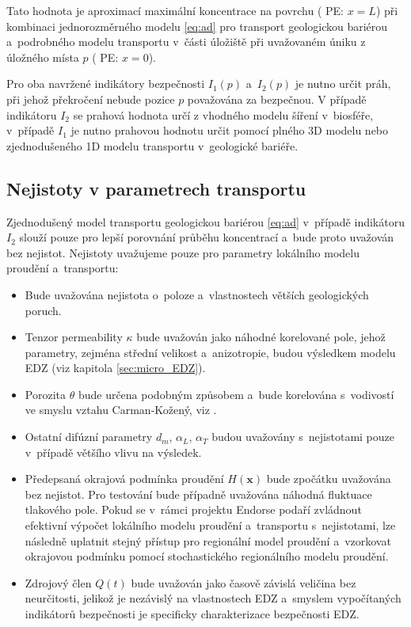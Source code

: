 \documentclass{article}
\def\vc#1{\mathbf{\boldsymbol{#1}}}     %
\newcommand{\pe}[1]{{\color{orange} PE: #1}}
\begin{document}
Tato hodnota je aproximací maximální koncentrace na povrchu (\pe{$x=L$})
při kombinaci jednorozměrného modelu \eqref{eq:ad} pro transport geologickou bariérou a~podrobného modelu transportu v~části úložiště při uvažovaném úniku z úložného místa $p$ (\pe{$x=0$}). 

Pro oba navržené indikátory bezpečnosti $I_1(p)$ a~$I_2(p)$ je nutno určit práh, při jehož překročení nebude pozice $p$ považována za bezpečnou. V případě indikátoru $I_2$ se prahová hodnota určí z vhodného modelu šíření  v~biosféře, v~případě $I_1$ je nutno prahovou hodnotu určit pomocí plného 3D modelu nebo zjednodušeného 1D modelu transportu v~geologické bariéře.



\subsection{Nejistoty v parametrech transportu}
\label{sec:nejistoty}
Zjednodušený model transportu geologickou bariérou \eqref{eq:ad} v~případě indikátoru $I_2$ slouží pouze pro lepší porovnání průběhu koncentrací a~bude proto uvažován bez nejistot. Nejistoty uvažujeme pouze pro parametry lokálního modelu proudění a~transportu:
\begin{itemize}
 \item Bude uvažována nejistota o~poloze a~vlastnostech větších geologických poruch.
 \item Tenzor permeability $\kappa$ bude uvažován jako náhodné korelované pole, jehož parametry, zejména střední velikost a~anizotropie, budou 
 výsledkem modelu EDZ (viz kapitola \ref{sec:micro_EDZ}).
 \item Porozita $\theta$ bude určena podobným způsobem a~bude korelována s~vodivostí ve smyslu vztahu Carman-Kožený, viz \cite{Carrier2003}.
 \item Ostatní difúzní parametry $d_m$, $\alpha_L$, $\alpha_T$ budou uvažovány s~nejistotami pouze v~případě většího vlivu na výsledek.
 \item Předepsaná okrajová podmínka proudění $H(\vc x)$ bude zpočátku uvažována bez nejistot. Pro testování bude případně uvažována náhodná fluktuace tlakového pole. Pokud se v~rámci projektu Endorse podaří zvládnout efektivní výpočet lokálního modelu proudění a~transportu s~nejistotami, lze následně uplatnit stejný přístup pro regionální model proudění a~vzorkovat okrajovou podmínku pomocí stochastického regionálního modelu proudění.
 \item Zdrojový člen $Q(t)$ bude uvažován jako časově závislá veličina bez neurčitosti, jelikož 
 je nezávislý na vlastnostech EDZ a~smyslem vypočítaných indikátorů bezpečnosti je specificky charakterizace bezpečnosti EDZ.
\end{itemize}
\end{document}

